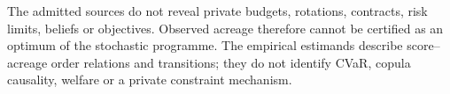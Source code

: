 The admitted sources do not reveal private budgets, rotations, contracts, risk limits, beliefs or objectives. Observed acreage therefore cannot be certified as an optimum of the stochastic programme. The empirical estimands describe score--acreage order relations and transitions; they do not identify CVaR, copula causality, welfare or a private constraint mechanism.
